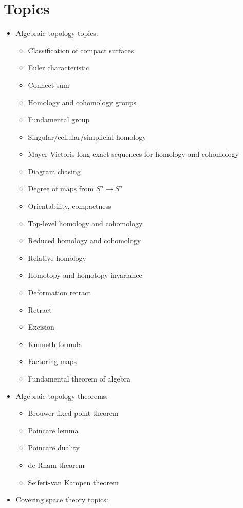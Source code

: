\hypertarget{topics}{%
\section{Topics}\label{topics}}

\begin{itemize}
\tightlist
\item
  Algebraic topology topics:

  \begin{itemize}
  \tightlist
  \item
    Classification of compact surfaces
  \item
    Euler characteristic
  \item
    Connect sum
  \item
    Homology and cohomology groups
  \item
    Fundamental group
  \item
    Singular/cellular/simplicial homology
  \item
    Mayer-Vietoris long exact sequences for homology and cohomology
  \item
    Diagram chasing
  \item
    Degree of maps from \(S^n \to S^n\)
  \item
    Orientability, compactness
  \item
    Top-level homology and cohomology
  \item
    Reduced homology and cohomology
  \item
    Relative homology
  \item
    Homotopy and homotopy invariance
  \item
    Deformation retract
  \item
    Retract
  \item
    Excision
  \item
    Kunneth formula
  \item
    Factoring maps
  \item
    Fundamental theorem of algebra
  \end{itemize}
\item
  Algebraic topology theorems:

  \begin{itemize}
  \tightlist
  \item
    Brouwer fixed point theorem
  \item
    Poincare lemma
  \item
    Poincare duality
  \item
    de Rham theorem
  \item
    Seifert-van Kampen theorem
  \end{itemize}
\item
  Covering space theory topics:


\end{itemize}
